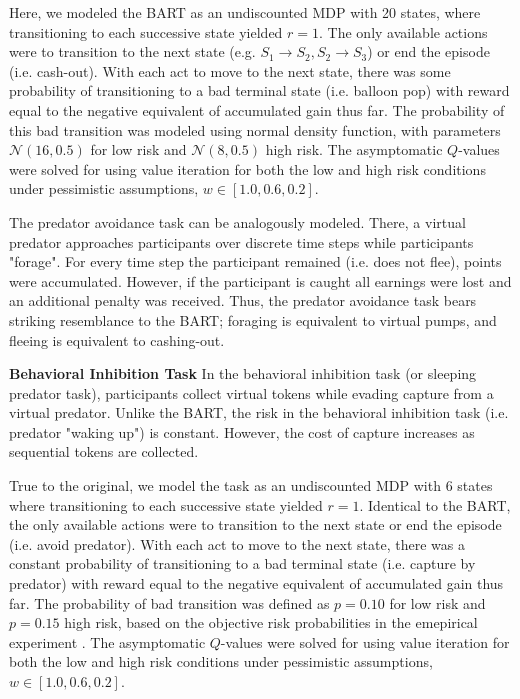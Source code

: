 \documentclass[11pt]{article} %
\begin{document}
Here, we modeled the BART as an undiscounted MDP with 20 states, where transitioning to each successive state yielded $r=1$. The only available actions were to transition to the next state (e.g. $S_1 \rightarrow S_2, S_2 \rightarrow S_3$) or end the episode (i.e. cash-out). With each act to move to the next state, there was some probability of transitioning to a bad terminal state (i.e. balloon pop) with reward equal to the negative equivalent of accumulated gain thus far. The probability of this bad transition was modeled using normal density function, with parameters $\mathcal{N}(16,0.5)$ for low risk and $\mathcal{N}(8,0.5)$ high risk. The asymptomatic $Q$-values were solved for using value iteration for both the low and high risk conditions under pessimistic assumptions, $w \in [1.0, 0.6, 0.2]$.

The predator avoidance task \citep{fung2019} can be analogously modeled. There, a virtual predator approaches participants over discrete time steps while participants "forage". For every time step the participant remained (i.e. does not flee), points were accumulated. However, if the participant is caught all earnings were lost and an additional penalty was received. Thus, the predator avoidance task bears striking resemblance to the BART; foraging is equivalent to virtual pumps, and fleeing is equivalent to cashing-out.

\textbf{Behavioral Inhibition Task} In the behavioral inhibition task \citep{bach2015} (or sleeping predator task), participants collect virtual tokens while evading capture from a virtual predator. Unlike the BART, the risk in the behavioral inhibition task (i.e. predator "waking up") is constant. However, the cost of capture increases as sequential tokens are collected.

True to the original, we model the task as an undiscounted MDP with 6 states where transitioning to each successive state yielded $r=1$. Identical to the BART, the only available actions were to transition to the next state or end the episode (i.e. avoid predator). With each act to move to the next state, there was a constant probability of transitioning to a bad terminal state (i.e. capture by predator) with reward equal to the negative equivalent of accumulated gain thus far. The probability of bad transition was defined as $p = 0.10$ for low risk and $p = 0.15$ high risk, based on the objective risk probabilities in the emepirical experiment \citep{bach2015}. The asymptomatic $Q$-values were solved for using value iteration for both the low and high risk conditions under pessimistic assumptions, $w \in [1.0, 0.6, 0.2]$.
\end{document}

